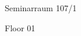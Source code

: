 \documentclass[a4paper]{article}
\begin{document}
\printGenericVSLHeader
\begin{center}
    \vspace{-2cm}
\begin{vsltext}{2cm}{3cm}

    \vspace{2cm}

    {}

    \vspace{0.5cm}

    Seminarraum 107/1

    \vspace{0.5cm}

    Floor 01

\end{vsltext}

\end{center}
\end{document}
